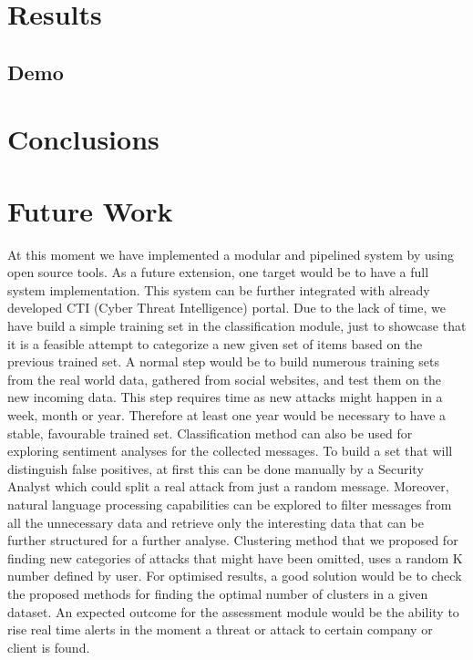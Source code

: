 \documentclass[12pt]{article}
\begin{document}
\section{Results}
\subsection{Demo}
\newpage
\section{Conclusions}



\newpage
\section{Future Work}

At this moment we have implemented a modular and pipelined system by using open source tools. As a future extension, one target would be to have a full system implementation. This system can be further integrated with already developed CTI (Cyber Threat Intelligence) portal. Due to the lack of time, we have build a simple training set in the classification module, just to showcase that it is a feasible attempt to categorize a new given set of items based on the previous trained set. A normal step would be to build numerous training sets from the real world data, gathered from social websites, and test them on the new incoming data. This step requires time as new attacks might happen in a week, month or year. Therefore at least one year would be necessary to have a stable, favourable trained set. Classification method can also be used for exploring sentiment analyses for the collected messages. To build a set that will distinguish false positives, at first this can be done manually by a Security Analyst which could split a real attack from just a random message. Moreover, natural language processing capabilities can be explored to filter messages from all the unnecessary data and retrieve only the interesting data that can be further structured for a further analyse. Clustering method that we proposed for finding new categories of attacks that might have been omitted, uses a random K number defined by user. For optimised results, a good solution would be to check the proposed methods for finding the optimal number of clusters in a given dataset. An expected outcome for the assessment module would be the ability to rise real time alerts in the moment a threat or attack to certain company or client is found.
\end{document}
